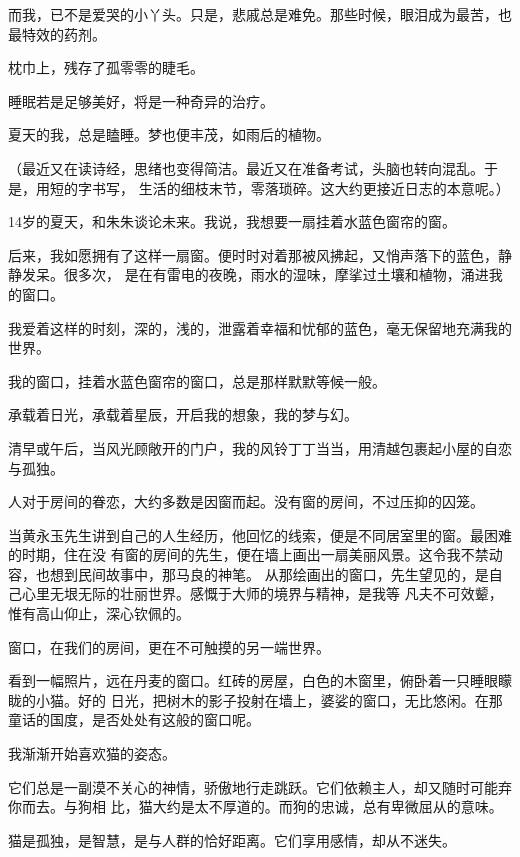 		而我，已不是爱哭的小丫头。只是，悲戚总是难免。那些时候，眼泪成为最苦，也最特效的药剂。\par
		枕巾上，残存了孤零零的睫毛。

		睡眠若是足够美好，将是一种奇异的治疗。\par
		夏天的我，总是瞌睡。梦也便丰茂，如雨后的植物。

		（最近又在读诗经，思绪也变得简洁。最近又在准备考试，头脑也转向混乱。于是，用短的字书写，
	生活的细枝末节，零落琐碎。这大约更接近日志的本意呢。）

	\endwriting



		14岁的夏天，和朱朱谈论未来。我说，我想要一扇挂着水蓝色窗帘的窗。

		后来，我如愿拥有了这样一扇窗。便时时对着那被风拂起，又悄声落下的蓝色，静静发呆。很多次，
	是在有雷电的夜晚，雨水的湿味，摩挲过土壤和植物，涌进我的窗口。

		我爱着这样的时刻，深的，浅的，泄露着幸福和忧郁的蓝色，毫无保留地充满我的世界。

		我的窗口，挂着水蓝色窗帘的窗口，总是那样默默等候一般。\par
		承载着日光，承载着星辰，开启我的想象，我的梦与幻。\par
		清早或午后，当风光顾敞开的门户，我的风铃丁丁当当，用清越包裹起小屋的自恋与孤独。

		人对于房间的眷恋，大约多数是因窗而起。没有窗的房间，不过压抑的囚笼。

		当黄永玉先生讲到自己的人生经历，他回忆的线索，便是不同居室里的窗。最困难的时期，住在没
	有窗的房间的先生，便在墙上画出一扇美丽风景。这令我不禁动容，也想到民间故事中，那马良的神笔。
	从那绘画出的窗口，先生望见的，是自己心里无垠无际的壮丽世界。感慨于大师的境界与精神，是我等
	凡夫不可效颦，惟有高山仰止，深心钦佩的。

		窗口，在我们的房间，更在不可触摸的另一端世界。

		看到一幅照片，远在丹麦的窗口。红砖的房屋，白色的木窗里，俯卧着一只睡眼矇眬的小猫。好的
	日光，把树木的影子投射在墙上，婆娑的窗口，无比悠闲。在那童话的国度，是否处处有这般的窗口呢。

		我渐渐开始喜欢猫的姿态。

		它们总是一副漠不关心的神情，骄傲地行走跳跃。它们依赖主人，却又随时可能弃你而去。与狗相
	比，猫大约是太不厚道的。而狗的忠诚，总有卑微屈从的意味。

		猫是孤独，是智慧，是与人群的恰好距离。它们享用感情，却从不迷失。

